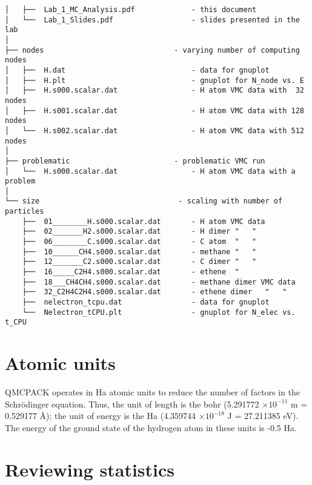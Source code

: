 \begin{verbatim}
│   ├──  Lab_1_MC_Analysis.pdf             - this document
│   └──  Lab_1_Slides.pdf                  - slides presented in the lab
│
├── nodes                              - varying number of computing nodes
│   ├──  H.dat                             - data for gnuplot
│   ├──  H.plt                             - gnuplot for N_node vs. E
│   ├──  H.s000.scalar.dat                 - H atom VMC data with  32 nodes
│   ├──  H.s001.scalar.dat                 - H atom VMC data with 128 nodes
│   └──  H.s002.scalar.dat                 - H atom VMC data with 512 nodes
│
├── problematic                        - problematic VMC run
│   └──  H.s000.scalar.dat                 - H atom VMC data with a problem
│
└── size                                - scaling with number of particles
    ├──  01________H.s000.scalar.dat       - H atom VMC data
    ├──  02_______H2.s000.scalar.dat       - H dimer "   "
    ├──  06________C.s000.scalar.dat       - C atom  "   "
    ├──  10______CH4.s000.scalar.dat       - methane "   "
    ├──  12_______C2.s000.scalar.dat       - C dimer "   "
    ├──  16_____C2H4.s000.scalar.dat       - ethene  " 
    ├──  18___CH4CH4.s000.scalar.dat       - methane dimer VMC data
    ├──  32_C2H4C2H4.s000.scalar.dat       - ethene dimer   "   "
    ├──  nelectron_tcpu.dat                - data for gnuplot
    └──  Nelectron_tCPU.plt                - gnuplot for N_elec vs. t_CPU
\end{verbatim}
\normalsize

\section{Atomic units} 

QMCPACK operates in Ha atomic units to reduce the
number of factors in the Schr\"odinger equation.  Thus, the unit of length is
the bohr (5.291772 $\times 10^{-11}$ m = 0.529177 \AA); the unit of energy is
the Ha (4.359744 $\times 10^{-18}$ J = 27.211385 eV).  The energy of the
ground state of the hydrogen atom in these units is -0.5 Ha.



\section{Reviewing statistics}
\label{sec:review}

